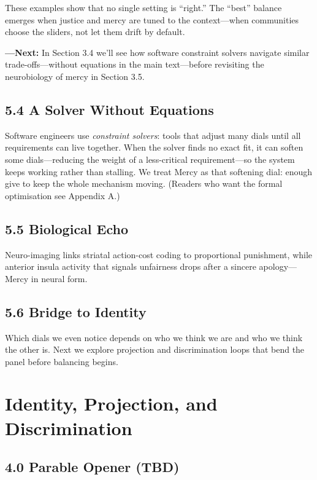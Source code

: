 \documentclass{book}       %
\begin{document}
These examples show that no single setting is “right.”  The “best” balance emerges when justice and mercy are tuned to the context—when communities choose the sliders, not let them drift by default.

\bigskip
\noindent\textbf{—Next:}  
In Section 3.4 we’ll see how software constraint solvers navigate similar trade-offs—without equations in the main text—before revisiting the neurobiology of mercy in Section 3.5.


\section*{5.4  A Solver Without Equations}
Software engineers use \emph{constraint solvers}: tools that adjust many dials until all requirements can live together.
When the solver finds no exact fit, it can soften some dials—reducing the weight of a less-critical requirement—so the system keeps working rather than stalling.  
We treat Mercy as that softening dial: enough give to keep the whole mechanism moving.
(Readers who want the formal optimisation see Appendix A.)

\section*{5.5  Biological Echo}
Neuro-imaging links striatal action-cost coding to proportional punishment\cite{Buckholtz2015_NeuroJustice},
while anterior insula activity that signals unfairness drops after a sincere apology—Mercy in neural form\cite{Yu2014_NeuroMercy}.

\section*{5.6  Bridge to Identity}
Which dials we even notice depends on who we think we are and who we think the other is.
Next we explore projection and discrimination loops that bend the panel before balancing begins.



\chapter{Identity, Projection, and Discrimination}

\section*{4.0  Parable Opener (TBD)}
\end{document}
